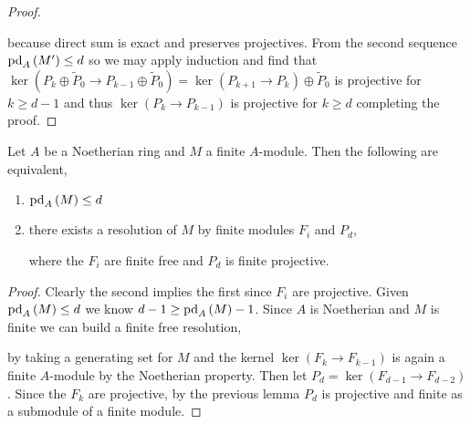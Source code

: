\documentclass[12pt]{article}
\begin{document}
\begin{proof}
\begin{center}
\end{center}
because direct sum is exact and preserves projectives. From the second sequence $\mathrm{pd}_{A} \left( M' \right) \le d$ so we may apply induction and find that $\ker{(P_k \oplus \tilde{P}_0 \to P_{k-1} \oplus \tilde{P}_0)} = \ker{(P_{k+1} \to P_{k})} \oplus \tilde{P}_0$ is projective for $k \ge d-1$ and thus $\ker{(P_k \to P_{k-1})}$ is projective for $k \ge d$ completing the proof.
\end{proof}

\begin{lemma}
Let $A$ be a Noetherian ring and $M$ a finite $A$-module. Then the following are equivalent,
\begin{enumerate}
\item $\mathrm{pd}_{A} \left( M \right) \le d$ 
\item there exists a resolution of $M$ by finite modules $F_i$ and $P_d$,
\begin{center}
\end{center}
where the $F_i$ are finite free and $P_d$ is finite projective.
\end{enumerate}
\end{lemma}

\begin{proof}
Clearly the second implies the first since $F_i$ are projective. Given $\mathrm{pd}_{A} \left( M \right) \le d$ we know $d - 1 \ge \mathrm{pd}_{A} \left( M \right) - 1$. Since $A$ is Noetherian and $M$ is finite we can build a finite free resolution,
\begin{center}
\end{center}
by taking a generating set for $M$ and the kernel $\ker{(F_k \to F_{k-1})}$ is again a finite $A$-module by the Noetherian property. Then let $P_d = \ker{(F_{d-1} \to F_{d-2})}$. Since the $F_k$ are projective, by the previous lemma $P_d$ is projective and finite as a submodule of a finite module.
\end{proof}
\end{document}
